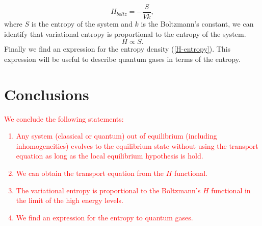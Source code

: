 \documentclass{article}
\begin{document}
{\begin{equation}
    H_{boltz}=-\frac{S}{Vk},
\end{equation}
where $S$ is the entropy of the system and $k$ is the Boltzmann's constant, we can identify that variational entropy is proportional to the entropy of the system.\\
\begin{equation}
    H\propto S.
\end{equation}
Finally we find an expression for the entropy density (\ref{H-entropy}). This expression will be useful to describe quantum gases in terms of the entropy.}
\section{Conclusions}
\textcolor{red}{We conclude the following statements:\\
\begin{enumerate}
    \item Any system (classical or quantum) out of equilibrium (including inhomogeneities) evolves to the equilibrium state without using the transport equation as long as the local equilibrium hypothesis is hold.
    \item We can obtain the transport equation from the $H$ functional.
    \item The variational entropy is proportional to the Boltzmann's $H$ functional in the limit of the high energy levels.
    \item We find an expression for the entropy to quantum gases.
    \end{enumerate}
  }
  
\clearpage
\end{document}

